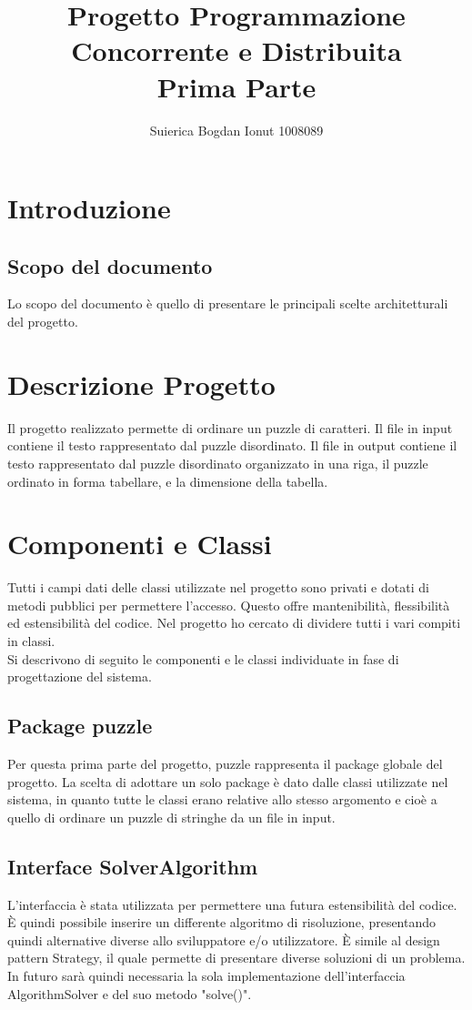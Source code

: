 \documentclass[11pt]{article}
\title{Progetto Programmazione Concorrente e Distribuita\\Prima Parte}
\author{Suierica Bogdan Ionut 1008089}
\begin{document}
\maketitle
\section{Introduzione}
\subsection{Scopo del documento}
Lo scopo del documento è quello di presentare le principali scelte architetturali del progetto.
\section{Descrizione Progetto}
Il progetto realizzato permette di ordinare un puzzle di caratteri.  Il file in input contiene il testo rappresentato dal puzzle disordinato. Il file in output contiene il testo rappresentato dal puzzle disordinato organizzato in una riga, il puzzle ordinato in forma tabellare, e la dimensione della tabella. 
\section{Componenti e Classi}
Tutti i campi dati delle classi utilizzate nel progetto sono privati e dotati di metodi pubblici per permettere l'accesso. Questo offre mantenibilità, flessibilità ed estensibilità del codice. Nel progetto ho cercato di dividere tutti i vari compiti in classi.\\
Si descrivono di seguito le componenti e le classi individuate in fase di progettazione del sistema.
\subsection{Package puzzle}
Per questa prima parte del progetto, puzzle rappresenta il package globale del progetto. La scelta di adottare un solo package è dato dalle classi utilizzate nel sistema, in quanto tutte le classi erano relative allo stesso argomento e cioè a quello di ordinare un puzzle di stringhe da un file in input.
\subsection{Interface SolverAlgorithm}
L’interfaccia è stata utilizzata per permettere una futura estensibilità del codice. È quindi possibile inserire un differente algoritmo di risoluzione, presentando quindi alternative diverse allo sviluppatore e/o utilizzatore. È simile al design pattern Strategy, il quale permette di presentare diverse soluzioni di un problema. In futuro sarà quindi necessaria la sola implementazione dell’interfaccia AlgorithmSolver e del suo metodo "solve()".
\end{document}
